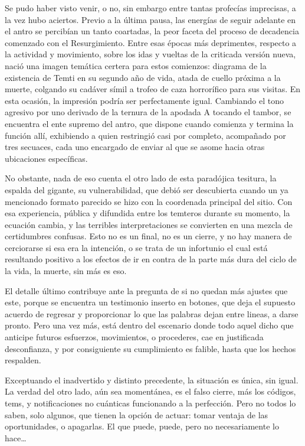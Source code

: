 \documentclass[
]{book}
\begin{document}
Se pudo haber visto venir, o no, sin embargo entre tantas profecías imprecisas, a la vez hubo aciertos. Previo a la última pausa, las energías de seguir adelante en el antro se percibían un tanto coartadas, la peor faceta del proceso de decadencia comenzado con el Resurgimiento. Entre esas épocas más deprimentes, respecto a la actividad y movimiento, sobre los idas y vueltas de la criticada versión nueva, nació una imagen temática certera para estos comienzos: diagrama de la existencia de Temti en su segundo año de vida, atada de cuello próxima a la muerte, colgando su cadáver símil a trofeo de caza horrorífico para sus visitas. En esta ocasión, la impresión podría ser perfectamente igual. Cambiando el tono agresivo por uno derivado de la ternura de la apodada A tocando el tambor, se encuentra el ente supremo del antro, que dispone cuando comienza y termina la función allí, exhibiendo a quien restringió casi por completo, acompañado por tres secuaces, cada uno encargado de enviar al que se asome hacia otras ubicaciones específicas.

No obstante, nada de eso cuenta el otro lado de esta paradójica tesitura, la espalda del gigante, su vulnerabilidad, que debió ser descubierta cuando un ya mencionado formato parecido se hizo con la coordenada principal del sitio. Con esa experiencia, pública y difundida entre los temteros durante su momento, la ecuación cambia, y las terribles interpretaciones se convierten en una mezcla de certidumbres confusas. Esto no es un final, no es un cierre, y no hay manera de cerciorarse si esa era la intención, o se trata de un infortunio el cual está resultando positivo a los efectos de ir en contra de la parte más dura del ciclo de la vida, la muerte, sin más es eso.

El detalle último contribuye ante la pregunta de si no quedan más ajustes que este, porque se encuentra un testimonio inserto en botones, que deja el supuesto acuerdo de regresar y proporcionar lo que las palabras dejan entre lineas, a darse pronto. Pero una vez más, está dentro del escenario donde todo aquel dicho que anticipe futuros esfuerzos, movimientos, o procederes, cae en justificada desconfianza, y por consiguiente su cumplimiento es falible, hasta que los hechos respalden.

Exceptuando el inadvertido y distinto precedente, la situación es única, sin igual. La verdad del otro lado, aún sea momentánea, es el falso cierre, más los códigos, tems, y notificaciones no cuánticas funcionando a la perfección. Pero no todos lo saben, solo algunos, que tienen la opción de actuar: tomar ventaja de las oportunidades, o apagarlas. El que puede, puede, pero no necesariamente lo hace\ldots{}
\end{document}

